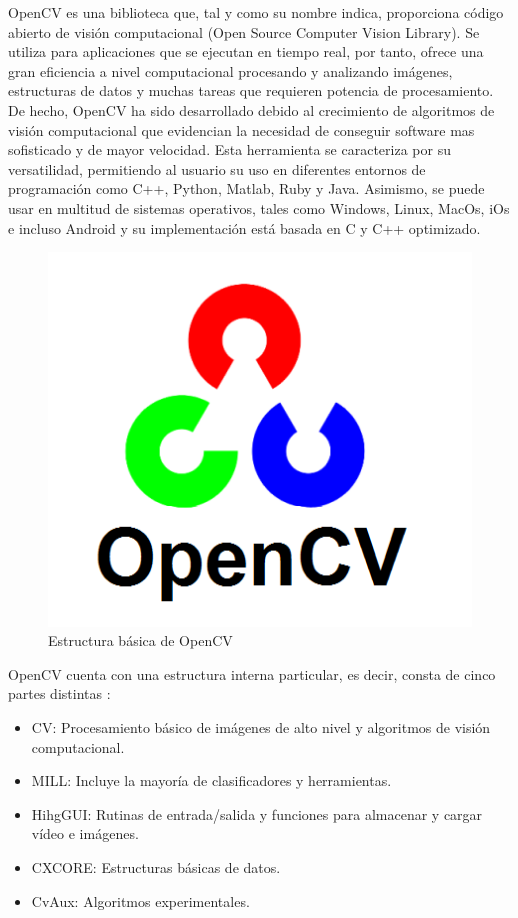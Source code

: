 OpenCV es una biblioteca que, tal y como su nombre indica, proporciona código abierto de visión computacional (Open Source Computer Vision Library). Se utiliza para aplicaciones que se ejecutan en tiempo real, por tanto, ofrece una gran eficiencia a nivel computacional procesando y analizando imágenes, estructuras de datos y muchas tareas que requieren potencia de procesamiento. De hecho, OpenCV ha sido desarrollado debido al crecimiento de algoritmos de visión computacional que evidencian la necesidad de conseguir software mas sofisticado y de mayor velocidad. 
Esta herramienta se caracteriza por su versatilidad, permitiendo al usuario su uso en diferentes entornos de programación como C++, Python, Matlab, Ruby y Java. Asimismo, se puede usar en multitud de sistemas operativos, tales como Windows, Linux, MacOs, iOs e incluso Android y su implementación está basada en C y C++ optimizado.

\begin{figure}
\centering
\includegraphics[scale = 0.5]{capitulo_02/figuras_dir/OpenCV.jpg}
\caption{Estructura básica de OpenCV}
\label{fig:figura2}
\end{figure}

OpenCV cuenta con una estructura interna particular, es decir, consta de cinco partes distintas \citep{libroopencv}:
\begin{itemize}
\item CV: Procesamiento básico de imágenes de alto nivel y algoritmos de visión computacional.
\item MILL: Incluye la mayoría de clasificadores y herramientas.
\item HihgGUI: Rutinas de entrada/salida y funciones para almacenar y cargar vídeo e imágenes.
\item CXCORE: Estructuras básicas de datos.
\item CvAux: Algoritmos experimentales.
\end{itemize}

